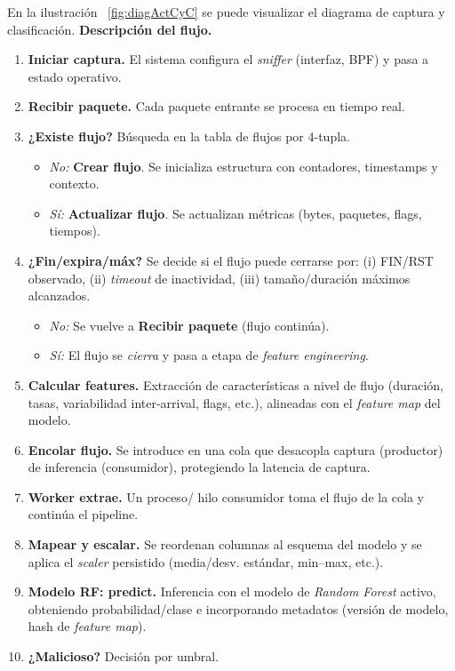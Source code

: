 En la ilustración ~\ref{fig:diagActCyC} se puede visualizar el diagrama de captura y clasificación.
\textbf{Descripción del flujo.}
\begin{enumerate}
  \item \textbf{Iniciar captura.} El sistema configura el \emph{sniffer} (interfaz, BPF) y pasa a estado operativo.
  \item \textbf{Recibir paquete.} Cada paquete entrante se procesa en tiempo real.
  \item \textbf{¿Existe flujo?} Búsqueda en la tabla de flujos por 4-tupla.
  \begin{itemize}
    \item \emph{No:} \textbf{Crear flujo}. Se inicializa estructura con contadores, timestamps y contexto.
    \item \emph{Sí:} \textbf{Actualizar flujo}. Se actualizan métricas (bytes, paquetes, flags, tiempos).
  \end{itemize}
  \item \textbf{¿Fin/expira/máx?} Se decide si el flujo puede cerrarse por: (i) FIN/RST observado, (ii) \emph{timeout} de inactividad, (iii) tamaño/duración máximos alcanzados.
  \begin{itemize}
    \item \emph{No:} Se vuelve a \textbf{Recibir paquete} (flujo continúa).
    \item \emph{Sí:} El flujo se \emph{cierra} y pasa a etapa de \emph{feature engineering}.
  \end{itemize}
  \item \textbf{Calcular features.} Extracción de características a nivel de flujo (duración, tasas, variabilidad inter-arrival, flags, etc.), alineadas con el \emph{feature map} del modelo.
  \item \textbf{Encolar flujo.} Se introduce en una cola que desacopla captura (productor) de inferencia (consumidor), protegiendo la latencia de captura.
  \item \textbf{Worker extrae.} Un proceso/ hilo consumidor toma el flujo de la cola y continúa el pipeline.
  \item \textbf{Mapear y escalar.} Se reordenan columnas al esquema del modelo y se aplica el \emph{scaler} persistido (media/desv. estándar, min–max, etc.).
  \item \textbf{Modelo RF: predict.} Inferencia con el modelo de \emph{Random Forest} activo, obteniendo probabilidad/clase e incorporando metadatos (versión de modelo, hash de \emph{feature map}).
  \item \textbf{¿Malicioso?} Decisión por umbral.

\end{enumerate}
